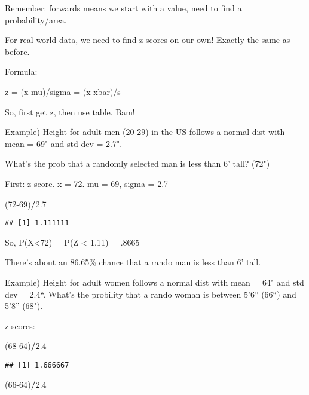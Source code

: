 \documentclass[]{article}
\newenvironment{Shaded}{\begin{snugshade}}{\end{snugshade}}
\newcommand{\DecValTok}[1]{\textcolor[rgb]{0.00,0.00,0.81}{#1}}
\newcommand{\FloatTok}[1]{\textcolor[rgb]{0.00,0.00,0.81}{#1}}
\newcommand{\NormalTok}[1]{#1}
\newcommand{\OperatorTok}[1]{\textcolor[rgb]{0.81,0.36,0.00}{\textbf{#1}}}
\begin{document}
Remember: forwards means we start with a value, need to find a
probability/area.

For real-world data, we need to find z scores on our own! Exactly the
same as before.

Formula:

z = (x-mu)/sigma = (x-xbar)/s

So, first get z, then use table. Bam!

Example) Height for adult men (20-29) in the US follows a normal dist
with mean = 69" and std dev = 2.7".

What's the prob that a randomly selected man is less than 6' tall? (72")

First: z score. x = 72. mu = 69, sigma = 2.7

\begin{Shaded}
\begin{Highlighting}[]
\NormalTok{(}\DecValTok{72-69}\NormalTok{)}\OperatorTok{/}\FloatTok{2.7}
\end{Highlighting}
\end{Shaded}

\begin{verbatim}
## [1] 1.111111
\end{verbatim}

So, P(X\textless{}72) = P(Z \textless{} 1.11) = .8665

There's about an 86.65\% chance that a rando man is less than 6' tall.

Example) Height for adult women follows a normal dist with mean = 64"
and std dev = 2.4``. What's the probility that a rando woman is between
5'6'' (66``) and 5'8'' (68").

z-scores:

\begin{Shaded}
\begin{Highlighting}[]
\NormalTok{(}\DecValTok{68-64}\NormalTok{)}\OperatorTok{/}\FloatTok{2.4}
\end{Highlighting}
\end{Shaded}

\begin{verbatim}
## [1] 1.666667
\end{verbatim}

\begin{Shaded}
\begin{Highlighting}[]
\NormalTok{(}\DecValTok{66-64}\NormalTok{)}\OperatorTok{/}\FloatTok{2.4}
\end{Highlighting}
\end{Shaded}
\end{document}
